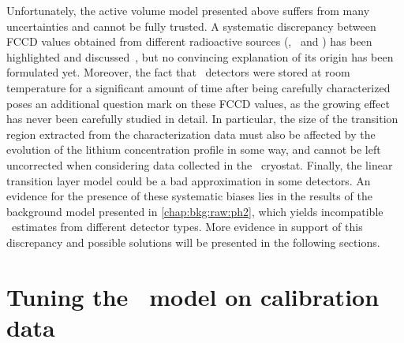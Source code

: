 Unfortunately, the active volume model presented above suffers from many uncertainties and
cannot be fully trusted. A systematic discrepancy between FCCD values obtained from
different radioactive sources (\Am, \Ba\ and \Co) has been highlighted and
discussed~\cite{Lehnert2016}, but no convincing explanation of its origin has been
formulated yet. Moreover, the fact that \bege\ detectors were stored at room temperature
for a significant amount of time after being carefully characterized poses an additional
question mark on these FCCD values, as the growing effect has never been carefully studied
in detail. In particular, the size of the transition region extracted from the
characterization data must also be affected by the evolution of the lithium concentration
profile in some way, and cannot be left uncorrected when considering data collected in the
\gerda\ cryostat. Finally, the linear transition layer model could be a bad approximation
in some detectors. An evidence for the presence of these systematic biases lies in the
results of the background model presented in \cref{chap:bkg:raw:ph2}, which yields
incompatible \thalftwo\ estimates from different detector types. More evidence in support
of this discrepancy and possible solutions will be presented in the following sections.

\section{Tuning the \bege\ model on calibration data}%
\label{sec:gedetav:calib-optim}

